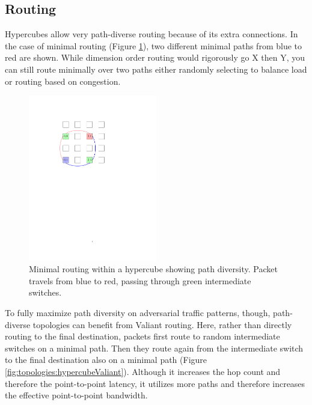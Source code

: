 \subsection{Routing}
Hypercubes allow very path-diverse routing because of its extra connections.
In the case of minimal routing (Figure \ref{fig:topologies:hypercubePath}), two different minimal paths from blue to red are shown.
While dimension order routing would rigorously go X then Y, you can still route minimally over two paths either randomly selecting to balance load or routing based on congestion.

\begin{figure}[h!]
\centering
\includegraphics[width=0.5\textwidth]{figures/tikz/hypercube/hypercube_path.pdf}
\caption{Minimal routing within a hypercube showing path diversity. Packet travels from blue to red, passing through green intermediate switches.}
\label{fig:topologies:hypercubePath}
\end{figure}

To fully maximize path diversity on adversarial traffic patterns, though, path-diverse topologies can benefit from Valiant routing.
Here, rather than directly routing to the final destination, packets first route to random intermediate switches on a minimal path.
Then they route again from the intermediate switch to the final destination also on a minimal path (Figure \ref{fig:topologies:hypercubeValiant}).
Although it increases the hop count and therefore the point-to-point latency, it utilizes more paths and therefore increases the effective point-to-point bandwidth.

